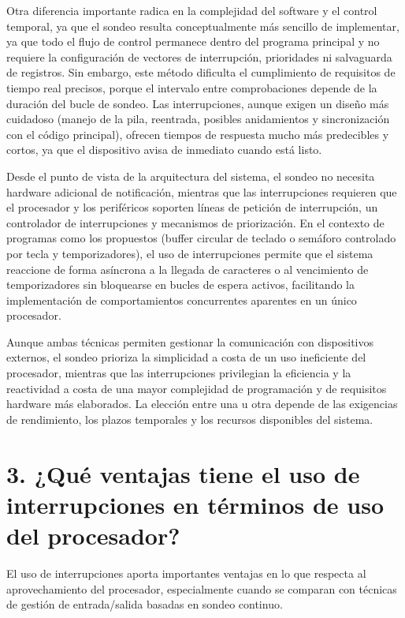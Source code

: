 \documentclass[12pt, letterpaper]{article}
\begin{document}
Otra diferencia importante radica en la complejidad del software y el control temporal, ya que el sondeo resulta conceptualmente más sencillo de implementar, ya que todo el flujo de control permanece dentro del programa principal y no requiere la configuración de vectores de interrupción, prioridades ni salvaguarda de registros. Sin embargo, este método dificulta el cumplimiento de requisitos de tiempo real precisos, porque el intervalo entre comprobaciones depende de la duración del bucle de sondeo. Las interrupciones, aunque exigen un diseño más cuidadoso (manejo de la pila, reentrada, posibles anidamientos y sincronización con el código principal), ofrecen tiempos de respuesta mucho más predecibles y cortos, ya que el dispositivo avisa de inmediato cuando está listo.

Desde el punto de vista de la arquitectura del sistema, el sondeo no necesita hardware adicional de notificación, mientras que las interrupciones requieren que el procesador y los periféricos soporten líneas de petición de interrupción, un controlador de interrupciones y mecanismos de priorización. 
En el contexto de programas como los propuestos (buffer circular de teclado o semáforo controlado por tecla y temporizadores), el uso de interrupciones permite que el sistema reaccione de forma asíncrona a la llegada de caracteres o al vencimiento de temporizadores sin bloquearse en bucles de espera activos, facilitando la implementación de comportamientos concurrentes aparentes en un único procesador.

Aunque ambas técnicas permiten gestionar la comunicación con dispositivos externos, el sondeo prioriza la simplicidad a costa de un uso ineficiente del procesador, mientras que las interrupciones privilegian la eficiencia y la reactividad a costa de una mayor complejidad de programación y de requisitos hardware más elaborados. La elección entre una u otra depende de las exigencias de rendimiento, los plazos temporales y los recursos disponibles del sistema.
\newpage

\section*{\textbf{\textbf{3. ¿Qué ventajas tiene el uso de interrupciones en términos de uso del procesador? }}}

El uso de interrupciones aporta importantes ventajas en lo que respecta al aprovechamiento del procesador, especialmente cuando se comparan con técnicas de gestión de entrada/salida basadas en sondeo continuo.
\end{document}
